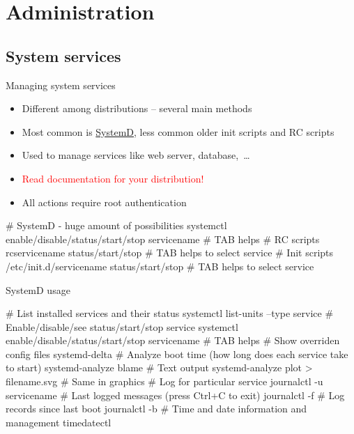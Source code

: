 \documentclass[compress, ucs, xelatex, 11pt, xcolor=svgnames,
  hyperref={
    bookmarks=true,
    unicode=true,
    colorlinks=true,
    pdftitle={Linux, command line and MetaCentrum},
    plainpages=false,
    pdfauthor={Vojtech Zeisek},
    pdfsubject={Course about use of Linux command line, writing shell scripts and using MetaCentrum of CESNET},
    pdfcreator={XeLaTeX},
    pdfkeywords={Linux, GNU, BASH, shell, command line, MetaCentrum},
    linkcolor=DarkRed,
    anchorcolor=DarkBlue,
    citecolor=Indigo,
    filecolor=NavyBlue,
    menucolor=DarkMagenta,
    urlcolor=DarkBlue,
    pdftex},
  url={hyphens, lowtilde} %
  ]{beamer}
\renewcommand{\alert}[1]{\textcolor{red}{#1}}
\begin{document}
\section{Administration}


\subsection{System services}

\begin{frame}[fragile]{Managing system services}
\begin{itemize}
  \item Different among distributions -- several main methods
  \item Most common is \href{https://wiki.freedesktop.org/www/Software/systemd/}{SystemD}, less common older init scripts and RC scripts
  \item Used to manage services like web server, database,~\ldots
  \item \alert{Read documentation for your distribution!}
  \item All actions require root authentication
\end{itemize}
  \begin{bashcode}
    # SystemD - huge amount of possibilities
    systemctl enable/disable/status/start/stop servicename # TAB helps
    # RC scripts
    rcservicename status/start/stop # TAB helps to select service
    # Init scripts
    /etc/init.d/servicename status/start/stop # TAB helps to select service
  \end{bashcode}
\end{frame}

\begin{frame}[fragile]{SystemD usage}
  \begin{bashcode}
    # List installed services and their status
    systemctl list-units --type service
    # Enable/disable/see status/start/stop service
    systemctl enable/disable/status/start/stop servicename # TAB helps
    # Show overriden config files
    systemd-delta
    # Analyze boot time (how long does each service take to start)
    systemd-analyze blame # Text output
    systemd-analyze plot > filename.svg # Same in graphics
    # Log for particular service
    journalctl -u servicename
    # Last logged messages (press Ctrl+C to exit)
    journalctl -f
    # Log records since last boot
    journalctl -b
    # Time and date information and management
    timedatectl
  \end{bashcode}
\end{frame}
\end{document}
